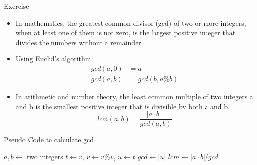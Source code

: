 \documentclass[10pt,t]{beamer}
\begin{document}
\begin{frame}[allowframebreaks]{Exercise}
  \begin{itemize}
  \item In mathematics, the greatest common divisor (gcd) of two or more integers, when at least one of them is not zero, is the largest positive integer that divides the numbers without a remainder.
  \item Using Euclid's algorithm
    \begin{align*}
      gcd(a,0) &= a \\
      gcd(a,b) &= gcd(b, a\% b)
    \end{align*}
  \item In arithmetic and number theory, the least common multiple of two integers a and b is the smallest positive integer that is divisible by both a and b.
    \begin{equation*}
      lcm(a,b) = \frac{\mid{}a\cdot{}b\mid}{gcd(a,b)}
    \end{equation*}
  \end{itemize}
  \begin{algorithm}[H]
    \caption{Pseudo Code to calculate gcd}
    \begin{algorithmic}
      \State $a,b \gets$ two integers
      \State $t\gets v$, $v\gets u\%v$, $u\gets t$
      \EndDo
      \State $gcd \gets |u|$
      \State $lcm \gets |a\cdot{}b|/gcd$
    \end{algorithmic}
  \end{algorithm}


\end{frame}
\end{document}
